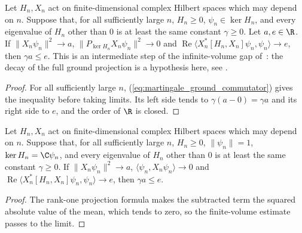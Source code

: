 \begin{theorem}
    \label{thm:martingale_commutator_gap_projection_limit}
    \leanok
    Let $H_n,X_n$ act on finite-dimensional complex Hilbert spaces which may depend on
    $n$. Suppose that, for all sufficiently large $n$, $H_n\geq0$, $\psi_n\in\ker H_n$,
    and every eigenvalue of $H_n$ other than $0$ is at least the same constant
    $\gamma\geq0$. Let $a,e\in\R$. If $\lVert X_n\psi_n\rVert^2\to a$,
    $\lVert P_{\ker H_n}X_n\psi_n\rVert^2\to0$ and
    $\operatorname{Re}\langle X_n^*[H_n,X_n]\psi_n,\psi_n\rangle\to e$, then
    $\gamma a\leq e$. This is an intermediate step of the infinite-volume gap
    of~\cite[Theorem~1.2]{Nachtergaele1996Spectral}: the decay of the full ground
    projection is a hypothesis here, see
    \cite{gap:nachtergaele96_infinite_volume_ground_projection}.
\end{theorem}
\begin{proof}\leanok
    For all sufficiently large $n$, (\ref{eq:martingale_ground_commutator}) gives the
    inequality before taking limits. Its left side tends to $\gamma(a-0)=\gamma a$ and
    its right side to $e$, and the order of $\R$ is closed.
\end{proof}

\begin{corollary}
    \label{cor:martingale_commutator_gap_rank_one_limit}
    \leanok
    Let $H_n,X_n$ act on finite-dimensional complex Hilbert spaces which may depend on
    $n$. Suppose that, for all sufficiently large $n$, $H_n\geq0$,
    $\lVert\psi_n\rVert=1$, $\ker H_n=\C\psi_n$, and every eigenvalue of $H_n$ other
    than $0$ is at least the same constant $\gamma\geq0$. If
    $\lVert X_n\psi_n\rVert^2\to a$, $\langle\psi_n,X_n\psi_n\rangle\to0$ and
    $\operatorname{Re}\langle X_n^*[H_n,X_n]\psi_n,\psi_n\rangle\to e$, then
    $\gamma a\leq e$.
\end{corollary}
\begin{proof}\leanok
    The rank-one projection formula makes the subtracted term the squared absolute
    value of the mean, which tends to zero, so the finite-volume estimate passes to the
    limit.
\end{proof}

